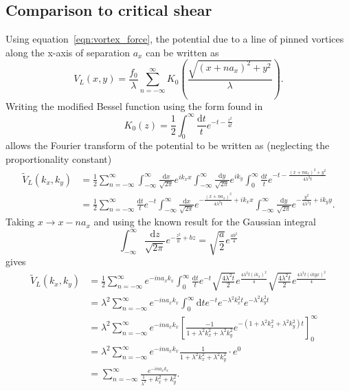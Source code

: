 \documentclass{article}
\numberwithin{equation}{section}
\begin{document}
\subsection{Comparison to critical shear} \label{sec:comp_crit_chear}
Using equation~\ref{eqn:vortex_force}, the potential due to a line of pinned vortices along the x-axis of separation $a_x$ can be written as \cite{Watkins2016DensitySuperconductors}
\begin{equation}
    V_L(x, y) = \frac{f_0}{\lambda}\sum_{n=-\infty}^\infty K_0 \left( \frac{\sqrt{(x + na_x)^2 + y^2}}{\lambda} \right).
\end{equation}
Writing the modified Bessel function using the form found in \cite{I.S.Gradshteyn2015TableProducts}
\begin{equation}
    K_0(z) = \frac{1}{2}\int_0^\infty \frac{\mathrm{d}t}{t}e^{-t-\frac{z^2}{4t}}
\end{equation}
allows the Fourier transform of the potential to be written as (neglecting the proportionality constant)
\begin{align*}
    \tilde{V}_L(k_x, k_y) &= \frac{1}{2}\sum_{n=-\infty}^\infty \int_{-\infty}^\infty\frac{\mathrm{d}x}{\sqrt{2\pi}}e^{ik_xx} \int_{-\infty}^\infty\frac{\mathrm{d}y}{\sqrt{2\pi}}e^{ik_y} \int_0^\infty\frac{\mathrm{d}t}{t}e^{-t-\frac{(x+na_x)^2 + y^2}{4\lambda^2t}} \\
    &= \frac{1}{2}\sum_{n=-\infty}^\infty \frac{\mathrm{d}t}{t}e^{-t} \int_{-\infty}^\infty\frac{\mathrm{d}x}{\sqrt{2\pi}}e^{-\frac{(x+na_x)^2}{4\lambda^2t}+ik_xx}
    \int_{-\infty}^\infty\frac{\mathrm{d}y}{\sqrt{2\pi}}e^{-\frac{y^2}{4\lambda^2t}+ik_yy}.
\end{align*}
Taking $x \rightarrow x - na_x$ and using the known result for the Gaussian integral
\begin{equation}
    \int_{-\infty}^\infty\frac{\mathrm{d}z}{\sqrt{2\pi}}e^{-\frac{z^2}{a}+bz} = \sqrt{\frac{a}{2}}e^{\frac{ab^2}{4}}
\end{equation}
gives
\begin{align*}
    \tilde{V}_L(k_x, k_y) &= \frac{1}{2}\sum_{n=-\infty}^\infty e^{-ina_xk_x} \int_0^\infty\frac{\mathrm{d}t}{t}e^{-t} \sqrt{\frac{4\lambda^2t}{2}}e^{\frac{4\lambda^2t(ik_x)^2}{4}} \sqrt{\frac{4\lambda^2t}{2}}e^{\frac{4\lambda^2t(ikyx)^2}{4}} \\
    &= \lambda^2\sum_{n=-\infty}^\infty e^{-ina_xk_x} \int_0^\infty\mathrm{d}te^{-t}e^{-\lambda^2k_x^2t}e^{-\lambda^2k_y^2t} \\
    &= \lambda^2\sum_{n=-\infty}^\infty e^{-ina_xk_x} \left[\frac{-1}{1+\lambda^2k_x^2+\lambda^2k_y^2} e^{-\left(1+\lambda^2k_x^2+\lambda^2k_y^2\right)t}\right]_0^\infty\ \\
    &= \lambda^2\sum_{n=-\infty}^\infty e^{-ina_xk_x} \frac{1}{1+\lambda^2k_x^2+\lambda^2k_y^2} \cdot e^0 \\
    &= \sum_{n=-\infty}^\infty \frac{e^{-ina_xk_x}}{\frac{1}{\lambda^2}+k_x^2+k_y^2}.
\end{align*}
\end{document}
